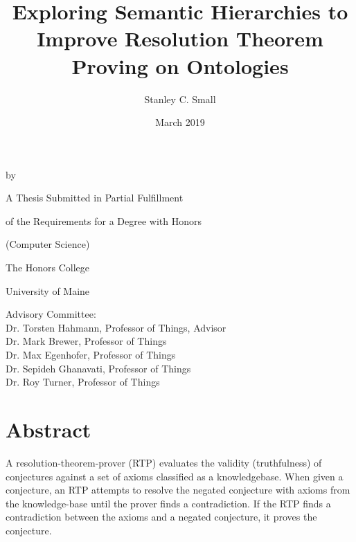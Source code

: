 \documentclass{article}
\title{Exploring Semantic Hierarchies to Improve Resolution Theorem Proving on Ontologies}
\author{Stanley C. Small}
\date{March 2019}
\begin{document}
	\begin{titlepage}
		\makeatletter
			\begin{center}
       				\MakeUppercase{\@title} \par
      				\smallskip 
     				\vspace{.15in} by \par
     				\smallskip
      				\vspace{.15in} \@author \par
      				\vspace{1in}
     				A Thesis Submitted in Partial Fulfillment  \par
      				of the Requirements for a Degree with Honors \par
      				(Computer Science) \par
      				\vspace{.75in}
      				The Honors College \par
      				University of Maine \par
      				\@date \par
     				\vfill
   			\end{center}
		\makeatother
		\begin{flushleft}
			Advisory Committee: \\
			\hspace{.3in} Dr. Torsten Hahmann, Professor of Things, Advisor \\
			\hspace{.3in} Dr. Mark Brewer, Professor of Things \\
			\hspace{.3in} Dr. Max Egenhofer, Professor of Things \\
			\hspace{.3in} Dr. Sepideh Ghanavati, Professor of Things \\
			\hspace{.3in} Dr. Roy Turner, Professor of Things
		\end{flushleft}
	\end{titlepage}
	
	\newpage
	\section*{Abstract}
A resolution-theorem-prover (RTP) evaluates the validity (truthfulness) of conjectures against a set of axioms classified as a knowledgebase. When given a conjecture, an RTP attempts to resolve the negated conjecture with axioms from the knowledge-base until the prover finds a contradiction. If the RTP finds a contradiction between the axioms and a negated conjecture, it proves the conjecture. 
\end{document}
